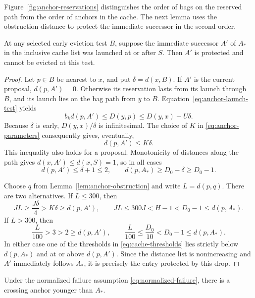 Figure~\ref{fig:anchor-reservations} distinguishes the order of bags
on the reserved path from the order of anchors in the cache.  The next
lemma uses the obstruction distance to protect the immediate successor
in the second order.


\begin{lemma}
\label{lem:protected-successor}
At any selected early eviction test $B$, suppose the immediate successor
$A'$ of $A_*$ in the inclusive cache list was launched at or after $S$.
Then $A'$ is protected and cannot be evicted at this test.
\end{lemma}

\begin{proof}
Let $p\in B$ be nearest to $x$, and put $\delta=d(x,B)$.
If $A'$ is the current proposal, $d(p,A')=0$.  Otherwise its reservation
lasts from its launch through $B$, and its launch lies on the bag path
from $y$ to $B$.  Equation~\eqref{eq:anchor-launch-test} yields
\[
 b_kd(p,A')\leq D(y,p)\leq D(y,x)+U\delta.
\]
Because $\delta$ is early, $D(y,x)/\delta$ is infinitesimal.  The choice
of $K$ in \eqref{eq:anchor-parameters} consequently gives, eventually,
\begin{equation}\label{eq:successor-distance-bounds}
 d(p,A')\leq K\delta.
\end{equation}
This inequality also holds for a proposal.  Monotonicity of distances
along the path gives $d(x,A')\leq d(x,S)=1$, so in all cases
\begin{equation}\label{eq:successor-absolute-bounds}
 d(p,A')\leq\delta+1\leq2,
 \qquad d(p,A_*)\geq D_0-\delta\geq D_0-1.
\end{equation}

Choose $q$ from Lemma~\ref{lem:anchor-obstruction} and write $L=d(p,q)$.
There are two alternatives.  If $L\leq300$, then
\[
 JL\geq\frac{J\delta}{4}>K\delta\geq d(p,A'),
 \qquad JL\leq300J<H-1<D_0-1\leq d(p,A_*).
\]
If $L>300$, then
\[
 \frac{L}{100}>3>2\geq d(p,A'),
 \qquad \frac{L}{100}\leq\frac{D_0}{10}
       <D_0-1\leq d(p,A_*).
\]
In either case one of the thresholds in \eqref{eq:cache-thresholds}
lies strictly below $d(p,A_*)$ and at or above $d(p,A')$.
Since the distance list is nonincreasing and $A'$ immediately follows
$A_*$, it is precisely the entry protected by this drop.
\end{proof}

\begin{lemma}
\label{lem:younger-crossing}
Under the normalized failure assumption \eqref{eq:normalized-failure},
there is a crossing anchor younger than $A_*$.
\end{lemma}


